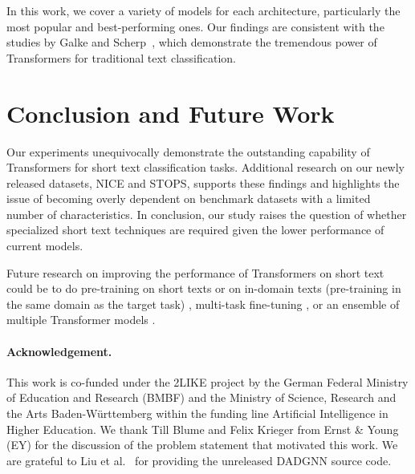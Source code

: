 \documentclass[runningheads]{llncs}
\begin{document}
In this work, we cover a variety of models for each architecture, particularly the most popular and best-performing ones.
Our findings are consistent with the studies by Galke and Scherp~\cite{galkeMLP}, which demonstrate the tremendous power of Transformers for traditional text classification.

\section{Conclusion and Future Work}
Our experiments unequivocally demonstrate the outstanding capability of Transformers for short text classification tasks.
Additional research on our newly released datasets, NICE and STOPS, supports these findings and highlights the issue of becoming overly dependent on benchmark datasets with a limited number of characteristics.
In conclusion, our study raises the question of whether specialized short text techniques are required given the lower performance of current models.

Future research on improving the performance of Transformers on short text could be to do pre-training on short texts or on in-domain texts (\ie pre-training in the same domain as the target task) \cite{sun2019fine,oreillyTransformer,brinkmann2021improving}, multi-task fine-tuning \cite{sun2019fine,oreillyTransformer}, or an ensemble of multiple Transformer models \cite{BERTensembleRanking}. 

\paragraph*{Acknowledgement.}
This work is co-funded under the 2LIKE project by the German Federal Ministry of Education and Research (BMBF) and the Ministry of Science, Research and the Arts Baden-Württemberg within the funding line Artificial Intelligence in Higher Education.
We thank Till Blume and Felix Krieger from Ernst \& Young (EY) for the discussion of the problem statement that motivated this work.
We are grateful to Liu et al.~\cite{liu2021deep} for providing the unreleased DADGNN source code.

\newpage


\end{document}
